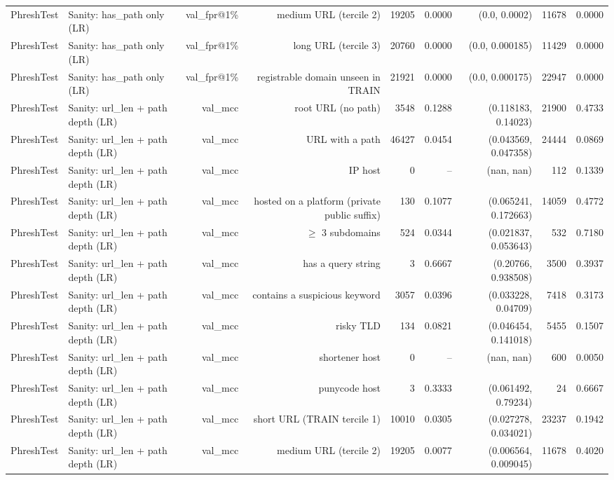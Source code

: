 \begin{table}[t]
\begin{tabular}{llrrrrrrr}
PhreshTest & Sanity: has\_path only (LR) & val\_fpr@1\% & medium URL (tercile 2) & 19205 & 0.0000 & (0.0, 0.0002) & 11678 & 0.0000 \\
PhreshTest & Sanity: has\_path only (LR) & val\_fpr@1\% & long URL (tercile 3) & 20760 & 0.0000 & (0.0, 0.000185) & 11429 & 0.0000 \\
PhreshTest & Sanity: has\_path only (LR) & val\_fpr@1\% & registrable domain unseen in TRAIN & 21921 & 0.0000 & (0.0, 0.000175) & 22947 & 0.0000 \\
PhreshTest & Sanity: url\_len + path depth (LR) & val\_mcc & root URL (no path) & 3548 & 0.1288 & (0.118183, 0.14023) & 21900 & 0.4733 \\
PhreshTest & Sanity: url\_len + path depth (LR) & val\_mcc & URL with a path & 46427 & 0.0454 & (0.043569, 0.047358) & 24444 & 0.0869 \\
PhreshTest & Sanity: url\_len + path depth (LR) & val\_mcc & IP host & 0 & -- & (nan, nan) & 112 & 0.1339 \\
PhreshTest & Sanity: url\_len + path depth (LR) & val\_mcc & hosted on a platform (private public suffix) & 130 & 0.1077 & (0.065241, 0.172663) & 14059 & 0.4772 \\
PhreshTest & Sanity: url\_len + path depth (LR) & val\_mcc & $\geq$ 3 subdomains & 524 & 0.0344 & (0.021837, 0.053643) & 532 & 0.7180 \\
PhreshTest & Sanity: url\_len + path depth (LR) & val\_mcc & has a query string & 3 & 0.6667 & (0.20766, 0.938508) & 3500 & 0.3937 \\
PhreshTest & Sanity: url\_len + path depth (LR) & val\_mcc & contains a suspicious keyword & 3057 & 0.0396 & (0.033228, 0.04709) & 7418 & 0.3173 \\
PhreshTest & Sanity: url\_len + path depth (LR) & val\_mcc & risky TLD & 134 & 0.0821 & (0.046454, 0.141018) & 5455 & 0.1507 \\
PhreshTest & Sanity: url\_len + path depth (LR) & val\_mcc & shortener host & 0 & -- & (nan, nan) & 600 & 0.0050 \\
PhreshTest & Sanity: url\_len + path depth (LR) & val\_mcc & punycode host & 3 & 0.3333 & (0.061492, 0.79234) & 24 & 0.6667 \\
PhreshTest & Sanity: url\_len + path depth (LR) & val\_mcc & short URL (TRAIN tercile 1) & 10010 & 0.0305 & (0.027278, 0.034021) & 23237 & 0.1942 \\
PhreshTest & Sanity: url\_len + path depth (LR) & val\_mcc & medium URL (tercile 2) & 19205 & 0.0077 & (0.006564, 0.009045) & 11678 & 0.4020 \\

\end{tabular}
\end{table}
